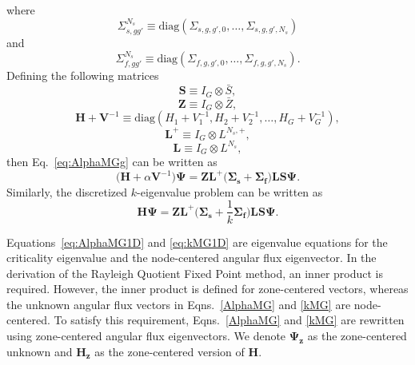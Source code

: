 where 
\begin{equation}
\Sigma_{s,gg'}^{N_{s}} \equiv \text{diag}(\Sigma_{s,g,g',0}, \dots, \Sigma_{s,g,g',N_{s}})
\end{equation}
and
\begin{equation}
\Sigma_{f,gg'}^{N_{s}} \equiv \text{diag}(\Sigma_{f,g,g',0}, \dots, \Sigma_{f,g,g',N_{s}}).
\end{equation}
Defining the following matrices 
\begin{equation}
\mathbf{S} \equiv I_{G} \otimes \bar{S},
\end{equation} 
\begin{equation}
\mathbf{Z} \equiv I_{G} \otimes \bar{Z},
\end{equation}
\begin{equation}
\mathbf{H} + \mathbf{V}^{-1} \equiv \text{diag}(H_{1} + V^{-1}_{1}, H_{2} + V^{-1}_{2}, \dots, H_{G} + V^{-1}_{G}),
\end{equation}
\begin{equation}
\mathbf{L}^{+} \equiv I_{G} \otimes L^{N_{s},+},
\end{equation}
\begin{equation}
\mathbf{L} \equiv I_{G} \otimes L^{N_{s}},
\end{equation} 
then Eq.~\ref{eq:AlphaMGg} can be written as
\begin{equation}
	\big ( \mathbf{H} + \alpha \mathbf{V}^{-1} \big ) \mathbf{\Psi} = \mathbf{Z} \mathbf{L}^{+}  \big ( \mathbf{\Sigma_{s}} + \mathbf{\Sigma_{f}} \big )\mathbf{L} \mathbf{S} \mathbf{\Psi}.
	\label{eq:AlphaMG1D}
\end{equation}
Similarly, the discretized $k$-eigenvalue problem can be written as
\begin{equation}
	\mathbf{H}\mathbf{\Psi}  = \mathbf{Z} \mathbf{L}^{+} \bigg ( \mathbf{\Sigma_{s}} + \frac{1}{k} \mathbf{\Sigma_{f}} \bigg ) \mathbf{L} \mathbf{S} \mathbf{\Psi}.
	\label{eq:kMG1D}
\end{equation}

Equations~\ref{eq:AlphaMG1D} and \ref{eq:kMG1D} are eigenvalue equations for the criticality eigenvalue and the node-centered angular flux eigenvector. In the derivation of the Rayleigh Quotient Fixed Point method, an inner product is required. However, the inner product is defined for zone-centered vectors, whereas the unknown angular flux vectors in Eqns.~\ref{AlphaMG} and \ref{kMG} are node-centered. To satisfy this requirement, Eqns.~\ref{AlphaMG} and \ref{kMG} are rewritten using zone-centered angular flux eigenvectors. We denote $\mathbf{\Psi_{z}}$ as the zone-centered unknown and $\mathbf{H_{z}}$ as the zone-centered version of $\mathbf{H}$.

